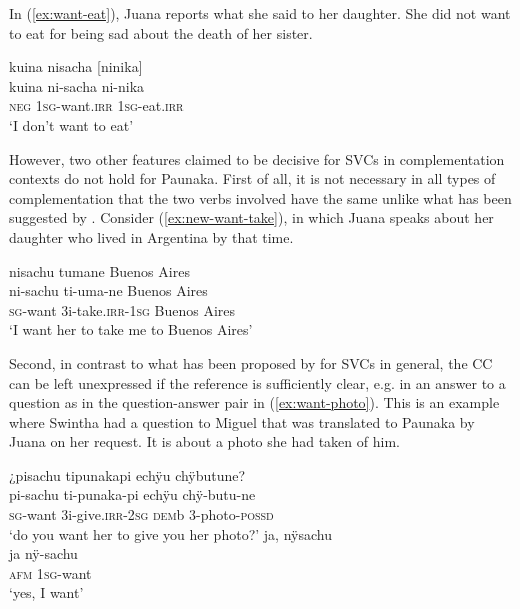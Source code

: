 In (\ref{ex:want-eat}), Juana reports what she said to her daughter. She did not want to eat for being sad about the death of her sister.

\ea\label{ex:want-eat}
\begingl
\glpreamble kuina nisacha \textup{[}ninika\textup{]}\\
\gla kuina ni-sacha ni-nika\\
\glb \textsc{neg} 1\textsc{sg}-want.\textsc{irr} 1\textsc{sg}-eat.\textsc{irr}\\
\glft ‘I don’t want to eat’
\endgl
\trailingcitation{[jxx-p120430l-2.239]}
\xe
{}

However, two other features claimed to be decisive for SVCs in complementation contexts do not hold for Paunaka. First of all, it is not necessary in all types of complementation that the two verbs involved have the same  unlike what has been suggested by \citet[34]{Dixon2006}. Consider (\ref{ex:new-want-take}), in which Juana speaks about her daughter who lived in Argentina by that time.

\ea\label{ex:new-want-take}
\begingl
\glpreamble nisachu tumane Buenos Aires\\
\gla ni-sachu ti-uma-ne {Buenos Aires}\\
\textsc{sg}-want 3i-take.\textsc{irr}-1\textsc{sg} {Buenos Aires}\\
\glft ‘I want her to take me to Buenos Aires’
\endgl
\trailingcitation{[jxx-e120516l-1.023]}
\xe

Second, in contrast to what has been proposed by \citet[3]{Aikhenvald2018} for SVCs in general, the CC can be left unexpressed if the reference is sufficiently clear, e.g. in an answer to a question as in the question-answer pair in (\ref{ex:want-photo}). This is an example where Swintha had a question to Miguel that was translated to Paunaka by Juana on her request. It is about a photo she had taken of him.

\ea\label{ex:want-photo}
  \ea
\begingl
\glpreamble ¿pisachu tipunakapi echÿu chÿbutune?\\
\gla pi-sachu ti-punaka-pi echÿu chÿ-butu-ne\\
\textsc{sg}-want 3i-give.\textsc{irr}-2\textsc{sg} \textsc{dem}b 3-photo-\textsc{possd}\\
\glft ‘do you want her to give you her photo?’
\endgl
  \ex
\begingl
\glpreamble ja, nÿsachu\\
\gla ja nÿ-sachu\\
\glb \textsc{afm} 1\textsc{sg}-want\\
\glft ‘yes, I want’
\endgl
\trailingcitation{[jmx-e090727s.039-040]}
\z
\xe
{}


